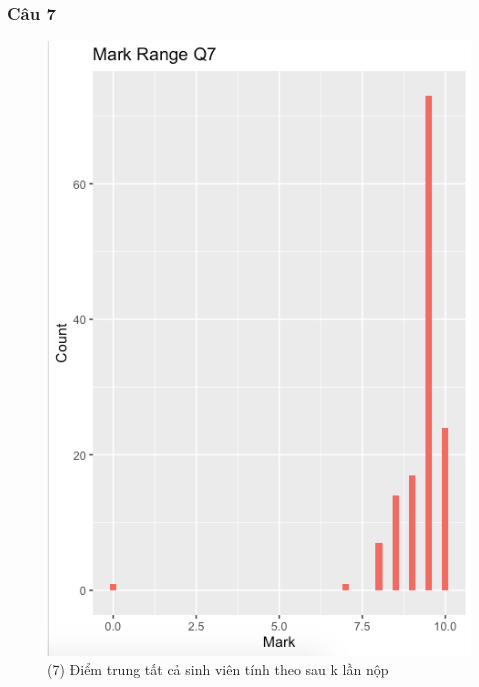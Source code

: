 \documentclass[a4paper]{article}
\theoremstyle{definition}
\begin{document}
\subsubsection{Câu 7}
\begin{figure}[!ht]
    \centering
    \includegraphics[scale=0.4]{Pics/q7-plot3.png}
    \caption{(7) Điểm trung tất cả sinh viên tính theo sau k lần nộp}
    \label{fig:my_label}
\end{figure}
\newpage
\end{document}
